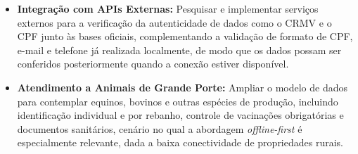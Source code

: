 \begin{itemize}
     \item \textbf{Integração com APIs Externas:}  Pesquisar e implementar serviços externos para a verificação da autenticidade de dados como o CRMV e o CPF junto às bases oficiais, complementando a validação de formato de CPF, e-mail e telefone já realizada localmente, de modo que os dados possam ser conferidos posteriormente quando a conexão estiver disponível.
     
     \item \textbf{Atendimento a Animais de Grande Porte:} Ampliar o modelo de dados para contemplar equinos, bovinos e outras espécies de produção, incluindo identificação individual e por rebanho, controle de vacinações obrigatórias e documentos sanitários, cenário no qual a abordagem \textit{offline-first} é especialmente relevante, dada a baixa conectividade de propriedades rurais.

\end{itemize}

